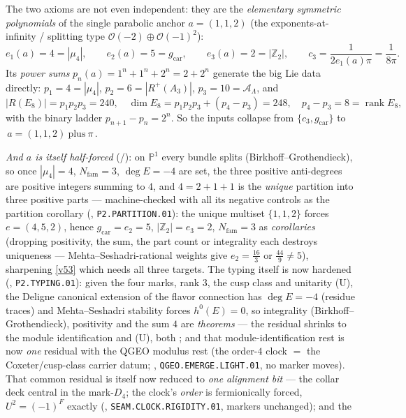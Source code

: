\documentclass[11pt,a4paper]{article}
\newcommand{\cthree}{c_3}
\newcommand{\gcar}{g_{\mathrm{car}}}
\newcommand{\Nfam}{N_{\mathrm{fam}}}
\newcommand{\Z}{\mathbb{Z}}
\begin{document}
\noindent The two axioms are not even independent: they are the \emph{elementary symmetric polynomials} of the
single parabolic anchor $a=(1,1,2)$ (the exponents-at-infinity / splitting type $\mathcal O(-2)\oplus\mathcal O(-1)^2$):
\[
  e_1(a)=4=|\mu_4|,\qquad e_2(a)=5=\gcar,\qquad e_3(a)=2=|\Z_2|,\qquad
  \cthree=\frac1{2e_1(a)\pi}=\frac1{8\pi}.
\]
Its \emph{power sums} $p_n(a)=1^n{+}1^n{+}2^n=2{+}2^n$ generate the big Lie data directly:
$p_1{=}4{=}|\mu_4|$, $p_2{=}6{=}|R^+(A_3)|$, $p_3{=}10{=}\mathcal A_\Lambda$, and
\[
  |R(E_8)|=p_1p_2p_3=240,\quad \dim E_8=p_1p_2p_3+(p_4-p_3)=248,\quad p_4-p_3=8=\operatorname{rank}E_8,
\]
with the binary ladder $p_{n+1}-p_n=2^n$. So the inputs collapse from $\{\cthree,\gcar\}$ to
$\boxed{\,a=(1,1,2)\ \text{plus}\ \pi\,}$. 
\par\smallskip
\noindent\emph{And $a$ is itself half-forced} (\mE/\mC): on $\mathbb P^1$ every bundle splits
(Birkhoff--Grothendieck), so once $|\mu_4|=4$, $\Nfam=3$, $\deg E=-4$ are set, the three positive
anti-degrees are positive integers summing to $4$, and $4=2+1+1$ is the \emph{unique} partition into three
positive parts --- machine-checked with all its negative controls as the partition corollary
(, \texttt{P2.PARTITION.01}): the unique multiset $\{1,1,2\}$
forces $e=(4,5,2)$, hence $\gcar=e_2=5$, $|\Z_2|=e_3=2$, $\Nfam=3$ as \emph{corollaries} (dropping
positivity, the sum, the part count or integrality each destroys uniqueness --- Mehta--Seshadri-rational
weights give $e_2=\tfrac{16}3$ or $\tfrac{44}9\neq5$), sharpening \vref{v53} which needs all three targets.
The typing itself is now hardened (, \texttt{P2.TYPING.01}): given
the four marks, rank $3$, the cusp class and unitarity (U), the Deligne canonical extension of the flavor
connection has $\deg E=-4$ (residue traces) and Mehta--Seshadri stability forces $h^0(E)=0$, so
integrality (Birkhoff--Grothendieck), positivity and the sum $4$ are \emph{theorems} --- the residual
shrinks to the module identification and (U), both \mC; and that module-identification rest is now
\emph{one} residual with the QGEO modulus rest (the order-$4$ clock $=$ the Coxeter/cusp-class carrier
datum; , \texttt{QGEO.EMERGE.LIGHT.01}, no marker moves).
That common residual is itself now reduced to \emph{one alignment bit} --- the collar deck central in
the mark-$D_4$; the clock's \emph{order} is fermionically forced, $U^2=(-1)^F$ exactly
(, \texttt{SEAM.CLOCK.RIGIDITY.01}, markers unchanged); and the
\end{document}
